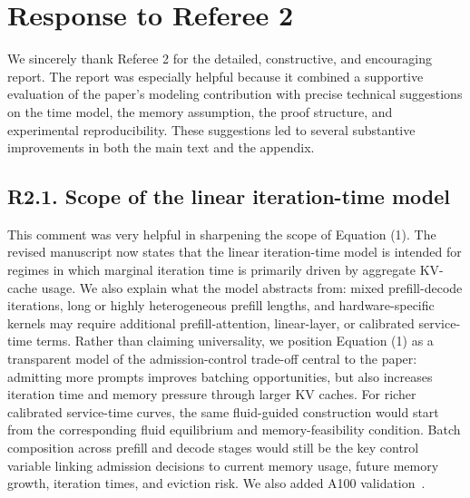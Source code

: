 \section*{Response to Referee 2}

We sincerely thank Referee 2 for the detailed, constructive, and encouraging report. The report was especially helpful because it combined a supportive evaluation of the paper's modeling contribution with precise technical suggestions on the time model, the memory assumption, the proof structure, and experimental reproducibility. These suggestions led to several substantive improvements in both the main text and the appendix.

\subsection*{R2.1. Scope of the linear iteration-time model}


\response This comment was very helpful in sharpening the scope of Equation (1). The revised manuscript now states that the linear iteration-time model is intended for regimes in which marginal iteration time is primarily driven by aggregate KV-cache usage. We also explain what the model abstracts from: mixed prefill-decode iterations, long or highly heterogeneous prefill lengths, and hardware-specific kernels may require additional prefill-attention, linear-layer, or calibrated service-time terms. Rather than claiming universality, we position Equation (1) as a transparent model of the admission-control trade-off central to the paper: admitting more prompts improves batching opportunities, but also increases iteration time and memory pressure through larger KV caches. For richer calibrated service-time curves, the same fluid-guided construction would start from the corresponding fluid equilibrium and memory-feasibility condition. Batch composition across prefill and decode stages would still be the key control variable linking admission decisions to current memory usage, future memory growth, iteration times, and eviction risk. We also added A100 validation~\citep{nvidia-a100-specs}.

